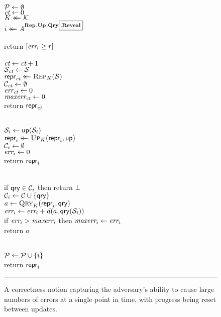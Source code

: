 \begin{figure}[t]
  {
     \\[2pt]
      $\mathcal{P} \gets \emptyset$\\
      $\textit{ct} \gets 0$ \\
      $K \mathrel{\leftarrow\mkern-14mu\leftarrow} \mathcal{K}$\\
      $i \mathrel{\leftarrow\mkern-14mu\leftarrow} \mathit{A}^{\mathbf{Rep}\hspace{0.5pt},\mathbf{Up}\hspace{0.5pt},\mathbf{Qry}\hspace{0.5pt}{\scriptsize\boxed{\!,\!\mathbf{Reveal}}}}$\\
       \\
      return $[\textit{err}_i \geq r]$ 
    \\[6pt]
    \oraclev{$\REPO(\col)$}\\[2pt]
      $\textit{ct}\gets\textit{ct}+1$ \\
      $\mathcal{S}_{\textit{ct}} \gets \mathcal{S}$\\
      $\mathsf{repr}_{\textit{ct}} \mathrel{\leftarrow\mkern-14mu\leftarrow} \textsc{Rep}_K(\mathcal{S})$\\
      $\mathcal{C}_{\textit{ct}} \gets \emptyset$\\
      $\textit{err}_{\textit{ct}} \gets 0$\\
      $\textit{maxerr}_{\textit{ct}} \gets 0$\\
      return $\mathsf{repr}_{\textit{ct}}$   }
  {
    \\[2pt]
      $\mathcal{S}_i \gets \mathsf{up}(\mathcal{S}_i)$\\
      $\mathsf{repr}_i \mathrel{\leftarrow\mkern-14mu\leftarrow} \textsc{Up}_K(\mathsf{repr}_i, \mathsf{up})$\\
      $\mathcal{C}_i \gets \emptyset$\\
      $\textit{err}_i \gets 0$\\
      return $\mathsf{repr}_i$ 
      \medskip

    \\[2pt]
      if $\mathsf{qry} \in \mathcal{C}_i$ then return $\bot$\\
      $\mathcal{C}_i \gets \mathcal{C} \cup \{\mathsf{qry}\}$\\
      $a \gets \textsc{Qry}_K(\mathsf{repr}_i, \mathsf{qry})$\\
      $\textit{err}_i \gets \textit{err}_i + d(a,\mathsf{qry}(\mathcal{S}_i))$\\
      if $\textit{err}_i > \textit{maxerr}_i$ then $\textit{maxerr}_i \gets \textit{err}_i$\\
      return $a$
      \medskip

    \\[2pt]
     $\mathcal{P} \gets \mathcal{P} \cup \{i\}$ \\
      return $\mathsf{repr}_i$
  }
  \caption{A correctness notion capturing the adversary's ability to cause large numbers of errors at a single point in time, with progress being reset between updates.}
  \vspace{6pt}\hrule
  \label{fig:security}
\end{figure}

